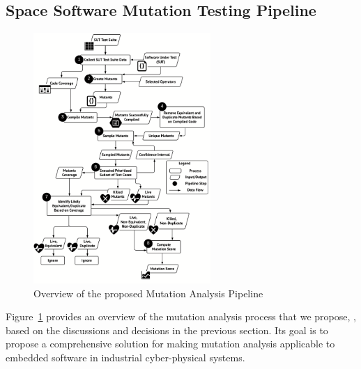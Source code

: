 
\subsection{Space Software Mutation Testing Pipeline}
\label{sec:approach}

\begin{figure}[tb]
\begin{center}
\includegraphics[width=0.6\textwidth]{images/Approach}
\caption{Overview of the proposed Mutation Analysis Pipeline}
\label{fig:approach}
\end{center}
\end{figure}

Figure~\ref{fig:approach} provides an overview of the mutation analysis process that we propose, \APPR, based on the discussions and decisions in the previous section. Its goal is to propose a comprehensive solution for making mutation analysis applicable to embedded software in industrial cyber-physical systems. 
 
